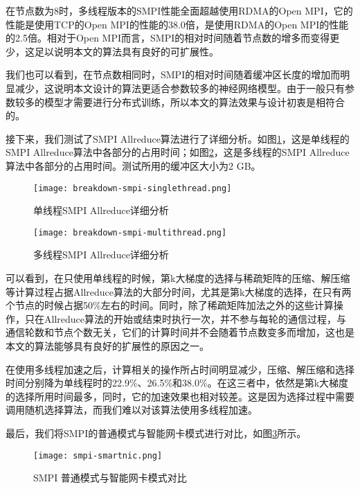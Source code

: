 在节点数为8时，多线程版本的SMPI性能全面超越使用RDMA的Open MPI，它的性能是使用TCP的Open MPI的性能的38.0倍，是使用RDMA的Open MPI的性能的2.5倍。相对于Open MPI而言，SMPI的相对时间随着节点数的增多而变得更少，这足以说明本文的算法具有良好的可扩展性。

我们也可以看到，在节点数相同时，SMPI的相对时间随着缓冲区长度的增加而明显减少，这说明本文设计的算法更适合参数较多的神经网络模型。由于一般只有参数较多的模型才需要进行分布式训练，所以本文的算法效果与设计初衷是相符合的。

接下来，我们测试了SMPI Allreduce算法进行了详细分析。如图\ref{fig:breakdown-smpi-singlethread}，这是单线程的SMPI Allreduce算法中各部分的占用时间；如图\ref{fig:breakdown-smpi-multithread}，这是多线程的SMPI Allreduce算法中各部分的占用时间。测试所用的缓冲区大小为2 GB。

\begin{figure}[ht] %
    \centering
    \texttt{[image: breakdown-smpi-singlethread.png]}
    \caption{单线程SMPI Allreduce详细分析}
    \label{fig:breakdown-smpi-singlethread}
  \end{figure}

  \begin{figure}[ht] %
    \centering
    \texttt{[image: breakdown-smpi-multithread.png]}
    \caption{多线程SMPI Allreduce详细分析}
    \label{fig:breakdown-smpi-multithread}
  \end{figure}

可以看到，在只使用单线程的时候，第k大梯度的选择与稀疏矩阵的压缩、解压缩等计算过程占据Allreduce算法的大部分时间，尤其是第k大梯度的选择，在只有两个节点的时候占据50\%左右的时间。同时，除了稀疏矩阵加法之外的这些计算操作，只在Allreduce算法的开始或结束时执行一次，并不参与每轮的通信过程，与通信轮数和节点个数无关，它们的计算时间并不会随着节点数变多而增加，这也是本文的算法能够具有良好的扩展性的原因之一。

在使用多线程加速之后，计算相关的操作所占时间明显减少，压缩、解压缩和选择时间分别降为单线程时的22.9\%、26.5\%和38.0\%。在这三者中，依然是第k大梯度的选择所用时间最多，同时，它的加速效果也相对较差。这是因为选择过程中需要调用随机选择算法，而我们难以对该算法使用多线程加速。

最后，我们将SMPI的普通模式与智能网卡模式进行对比，如图\ref{fig:smpi-smartnic}所示。

\begin{figure}[ht] %
    \centering
    \texttt{[image: smpi-smartnic.png]}
    \caption{SMPI 普通模式与智能网卡模式对比}
    \label{fig:smpi-smartnic}
  \end{figure}

